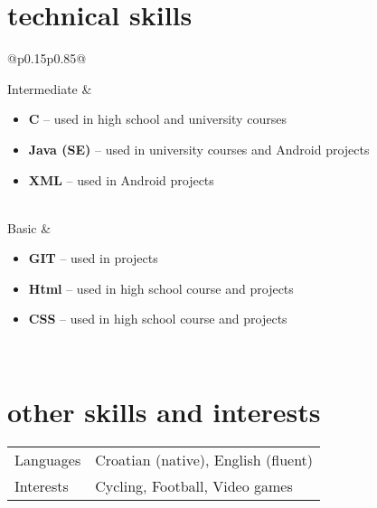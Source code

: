\documentclass[a4paper]{article}
\makeatletter
\newlength{\tablewidth}
\newenvironment{skills}{%
\setlength{\tablewidth}{\linewidth}
\addtolength{\tablewidth}{-2\tabcolsep}
\begin{tabular}{@{}p{0.15\tablewidth}p{0.85\tablewidth}@{}}
}{%
\end{tabular}
}
\makeatother
\begin{document}
\section{technical skills}
\begin{skills}
    Intermediate &
    \begin{itemize}
    	\item \textbf{C} -- used in high school and university courses
        \item \textbf{Java (SE)} -- used in university courses and Android projects
        \item \textbf{XML} -- used in Android projects
    \end{itemize} \\
    Basic &
    \begin{itemize}
        \item \textbf{GIT} -- used in projects 
        \item \textbf{Html} -- used in high school course and projects
        \item \textbf{CSS} -- used in high school course and projects
    \end{itemize} \\
\end{skills}

\section{other skills and interests}
\begin{skills}
    Languages & Croatian (native), English (fluent)\\
    Interests & Cycling, Football, Video games \\
\end{skills}
\end{document}
